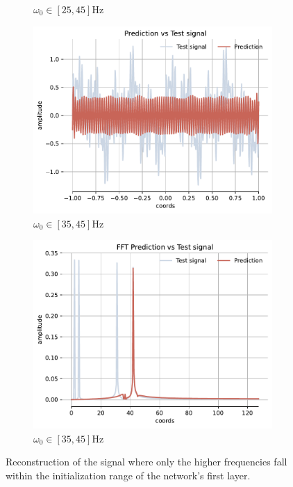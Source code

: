 \begin{figure}[h!]
\begin{subfigure}[b]{0.38\textwidth}
        \caption{$\omega_0 \in [25, 45]$Hz}
        \label{fig:fft-25-45}
    \end{subfigure}
    \begin{subfigure}[b]{0.38\textwidth}
        \centering
        \includegraphics[width=\textwidth]{img/ch4/prediction_w35-45.pdf}
        \caption{$\omega_0 \in [35, 45]$Hz}
        \label{fig:rec-35-45}
    \end{subfigure}
    \begin{subfigure}[b]{0.38\textwidth}
        \centering
        \includegraphics[width=\textwidth]{img/ch4/fft_w35-45.pdf}
        \caption{$\omega_0 \in [35, 45]$Hz}
        \label{fig:fft-35-45}
    \end{subfigure}
    \label{f:high-freqs-reconstruction}
    \caption{Reconstruction of the signal where only the higher frequencies fall within the initialization range of the network’s first layer.}
\end{figure}

